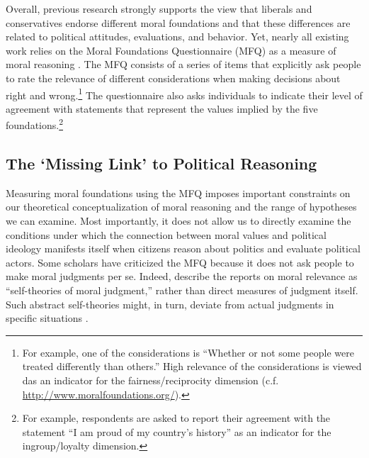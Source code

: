 \documentclass[12pt]{article}
\begin{document}
Overall, previous research strongly supports the view that liberals and conservatives endorse different moral foundations and that these differences are related to political attitudes, evaluations, and behavior. Yet, nearly all existing work relies on the Moral Foundations Questionnaire (MFQ) as a measure of moral reasoning \citep[but see][]{clifford2014linking}. The MFQ consists of a series of items that explicitly ask people to rate the relevance of different considerations when making decisions about right and wrong.\footnote{For example, one of the considerations is ``Whether or not some people were treated differently than others.'' High relevance of the considerations is viewed das an indicator for the fairness/reciprocity dimension (c.f. \url{http://www.moralfoundations.org/}).} The questionnaire also asks individuals to indicate their level of agreement with statements that represent the values implied by the five foundations.\footnote{For example, respondents are asked to report their agreement with the statement ``I am proud of my country’s history'' as an indicator for the ingroup/loyalty dimension.}


\subsection{The `Missing Link' to Political Reasoning}

Measuring moral foundations using the MFQ imposes important constraints on our theoretical conceptualization of moral reasoning and the range of hypotheses we can examine. Most importantly, it does not allow us to directly examine the conditions under which the connection between moral values and political ideology manifests itself when citizens reason about politics and evaluate political actors. Some scholars have criticized the MFQ because it does not ask people to make moral judgments per se. Indeed, \citet[1031]{graham2009liberals} describe the reports on moral relevance as ``self-theories of moral judgment,'' rather than direct measures of judgment itself. Such abstract self-theories might, in turn, deviate from actual judgments in specific situations \citep[see][for an alternative way to measure moral judgment]{clifford2015moral}.
\end{document}
